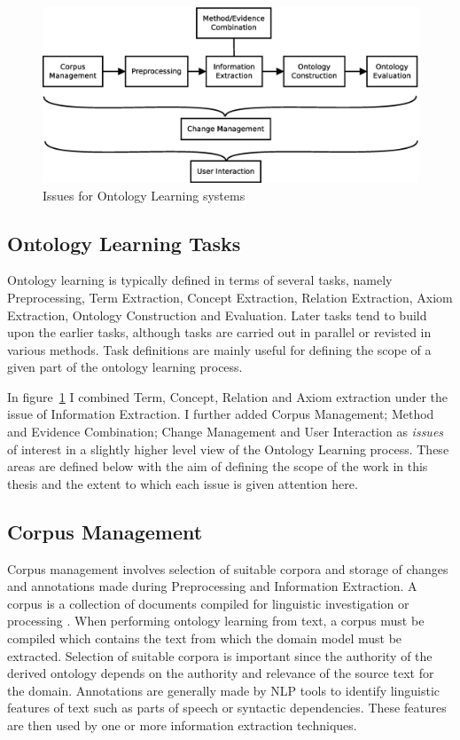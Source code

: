\documentclass[a4paper]{report}
\begin{document}
\begin{figure}
  \includegraphics[width=\textwidth]{graphics/ontology-learning-system-issues.eps}
  \caption{Issues for Ontology Learning systems}
  \label{fig:ol-issues}
\end{figure}

\subsection{Ontology Learning Tasks}

Ontology learning is typically defined in terms of several tasks, namely Preprocessing, Term Extraction, Concept Extraction, Relation Extraction, Axiom Extraction, Ontology Construction and Evaluation.
Later tasks tend to build upon the earlier tasks, although tasks are carried out in parallel or revisted in various methods.
Task definitions are mainly useful for defining the scope of a given part of the ontology learning process.

In figure~\ref{fig:ol-issues} I combined Term, Concept, Relation and Axiom extraction under the issue of Information Extraction.
I further added Corpus Management; Method and Evidence Combination; Change Management and User Interaction as \emph{issues} of interest in a slightly higher level view of the Ontology Learning process.
These areas are defined below with the aim of defining the scope of the work in this thesis and the extent to which each issue is given attention here.

\subsection{Corpus Management}
\label{sec:background:corp_mgmt}

Corpus management involves selection of suitable corpora and storage of changes and annotations made during Preprocessing and Information Extraction.
A corpus is a collection of documents compiled for linguistic investigation or processing \citep{KokkinakisGerdin10MedCorp}.
When performing ontology learning from text, a corpus must be compiled which contains the text from which the domain model must be extracted.
Selection of suitable corpora is important since the authority of the derived ontology depends on the authority and relevance of the source text for the domain.
Annotations are generally made by NLP tools to identify linguistic features of text such as parts of speech or syntactic dependencies.
These features are then used by one or more information extraction techniques.
\end{document}
